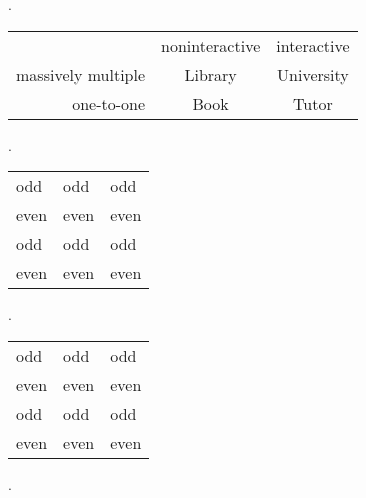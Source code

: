 \documentclass{article}
\begin{document}
{
.\newline\newline\newline
}





\begin{tabular}{ r|c|c| }
\multicolumn{1}{r}{}
 &  \multicolumn{1}{c}{noninteractive}
 & \multicolumn{1}{c}{interactive} \\
\cline{2-3}
massively multiple & Library & University \\
\cline{2-3}
one-to-one & Book & Tutor \\
\cline{2-3}
\end{tabular}



{
.\newline\newline\newline
}


\begin{center}

\begin{tabular}{lll}
odd 	& odd 	& odd \\
even 	& even 	& even\\
odd 	& odd 	& odd \\
even 	& even 	& even\\
\end{tabular}
\end{center}



{
.\newline\newline
}





\begin{center}

\begin{tabular}{lll}
odd 	& odd 	& odd \\
even 	& even 	& even\\
odd 	& odd 	& odd \\
even 	& even 	& even\\
\end{tabular}
\end{center}



{
.\newline\newline
}
\end{document}
